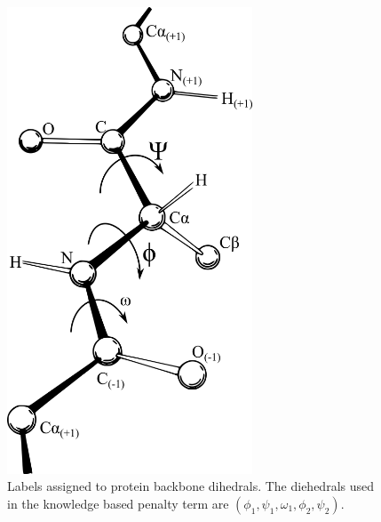 \begin{figure}[h]
    \centering
    \includegraphics[width=0.65\textwidth,height=0.3\textheight,keepaspectratio]{figures/backbone_labels.png}
    \caption{Labels assigned to protein backbone dihedrals.
The diehedrals used in the knowledge based penalty term are $(\phi_{1}, \psi_{1}, \omega_{1}, \phi_{2}, \psi_{2})$.}
    \label{figure:backbone_labels}
\end{figure}

